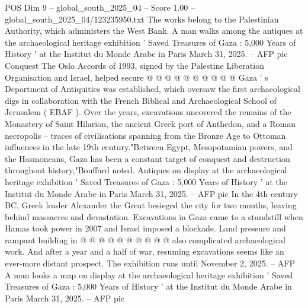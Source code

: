 \begin{textsample}{POS Dim 9 – global\_south\_2025\_04 – Score 1.00 – global\_south\_2025\_04/123235950.txt}
The works belong to the Palestinian Authority, which administers the West Bank.
A man walks among the antiques at the archaeological heritage exhibition ' Saved Treasures of Gaza : 5,000 Years of History ' at the Institut du Monde Arabe in Paris March 31, 2025. -- AFP pic Conquest The Oslo Accords of 1993, signed by the Palestine Liberation Organisation and Israel, helped secure @ @ @ @ @ @ @ @ @ @ Gaza ' s Department of Antiquities was established, which oversaw the first archaeological digs in collaboration with the French Biblical and Archaeological School of Jerusalem ( EBAF ).
Over the years, excavations uncovered the remains of the Monastery of Saint Hilarion, the ancient Greek port of Anthedon, and a Roman necropolis -- traces of civilisations spanning from the Bronze Age to Ottoman influences in the late 19th century."Between Egypt, Mesopotamian powers, and the Hasmoneans, Gaza has been a constant target of conquest and destruction throughout history,"Bouffard noted.
Antiques on display at the archaeological heritage exhibition ' Saved Treasures of Gaza : 5,000 Years of History ' at the Institut du Monde Arabe in Paris March 31, 2025. -- AFP pic In the 4th century BC, Greek leader Alexander the Great besieged the city for two months, leaving behind massacres and devastation.
Excavations in Gaza came to a standstill when Hamas took power in 2007 and Israel imposed a blockade.
Land pressure and rampant building in @ @ @ @ @ @ @ @ @ @ also complicated archaeological work.
And after a year and a half of war, resuming excavations seems like an ever-more distant prospect.
The exhibition runs until November 2, 2025. -- AFP A man looks a map on display at the archaeological heritage exhibition ' Saved Treasures of Gaza : 5,000 Years of History ' at the Institut du Monde Arabe in Paris March 31, 2025. -- AFP pic

\end{textsample}
